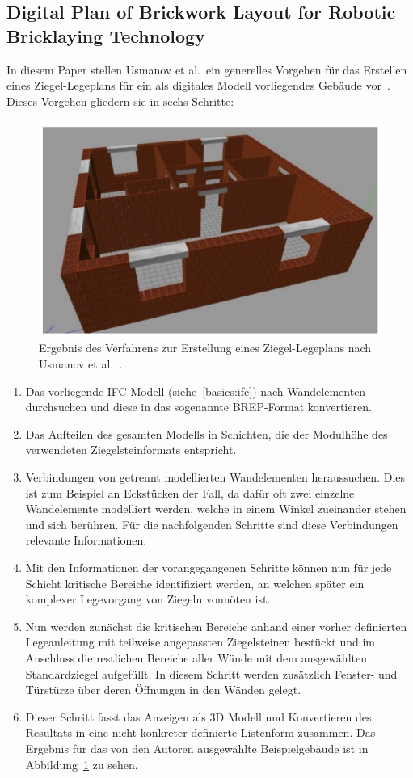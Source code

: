 \subsection{Digital Plan of Brickwork Layout for Robotic Bricklaying Technology}\label{related:digital_plan_of_brickwork_layout}
In diesem Paper stellen Usmanov et al.\ ein generelles Vorgehen für das Erstellen eines Ziegel-Legeplans für ein als digitales Modell vorliegendes Gebäude vor~\cite{Usmanov2021}.
Dieses Vorgehen gliedern sie in sechs Schritte:
\begin{figure}[h!]
    \centering
    \includegraphics[width=0.5\columnwidth]{fig/sustainability1303905g004.png}
    \caption{Ergebnis des Verfahrens zur Erstellung eines Ziegel-Legeplans nach Usmanov et al.~\cite{Usmanov2021}.}\label{fig:related:usmanov}
\end{figure}
\begin{enumerate}
\item Das vorliegende IFC Modell (siehe~\ref{basics:ifc}) nach Wandelementen durchsuchen und diese in das sogenannte BREP-Format konvertieren.
\item Das Aufteilen des gesamten Modells in Schichten, die der Modulhöhe des verwendeten Ziegelsteinformats entspricht.
\item Verbindungen von getrennt modellierten Wandelementen heraussuchen. 
Dies ist zum Beispiel an Eckstücken der Fall, da dafür oft zwei einzelne Wandelemente modelliert werden, welche in einem Winkel zueinander stehen und sich berühren. 
Für die nachfolgenden Schritte sind diese Verbindungen relevante Informationen.
\item Mit den Informationen der vorangegangenen Schritte können nun für jede Schicht kritische Bereiche identifiziert werden, an welchen später ein komplexer Legevorgang von Ziegeln vonnöten ist.
\item Nun werden zunächst die kritischen Bereiche anhand einer vorher definierten Legeanleitung mit teilweise angepassten Ziegelsteinen bestückt und im Anschluss die restlichen Bereiche aller Wände mit dem ausgewählten Standardziegel aufgefüllt. 
In diesem Schritt werden zusätzlich Fenster- und Türstürze über deren Öffnungen in den Wänden gelegt.
\item Dieser Schritt fasst das Anzeigen als 3D Modell und Konvertieren des Resultats in eine nicht konkreter definierte Listenform zusammen. 
Das Ergebnis für das von den Autoren ausgewählte Beispielgebäude ist in Abbildung~\ref{fig:related:usmanov} zu sehen. 
\end{enumerate}

